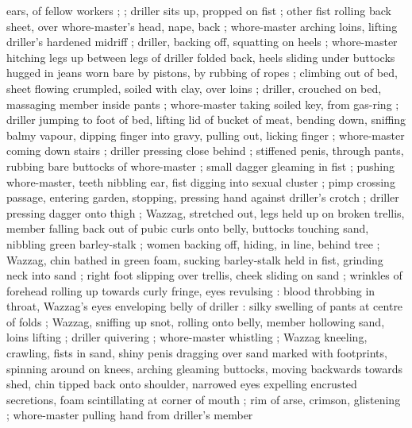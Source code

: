 ears, of fellow workers ; {\thd}  ; driller sits up, propped on fist ; other fist rolling back sheet, over whore-master's head, nape, back ; whore-master arching loins, lifting driller's hardened midriff ; driller, backing off, squatting on heels ; whore-master hitching legs up between legs of driller folded back, heels sliding under buttocks hugged in jeans worn bare by pistons, by rubbing of ropes ; climbing out of bed, sheet flowing crumpled, soiled with clay, over loins ; driller, crouched on bed, massaging member inside pants ; whore-master taking soiled key, from gas-ring ; driller jumping to foot of bed, lifting lid of bucket of meat, bending down, sniffing balmy vapour, dipping finger into gravy, pulling out, licking finger ; whore-master coming down stairs ; driller pressing close behind ; stiffened penis, through pants, rubbing bare buttocks of whore-master{\td}  ; small dagger gleaming in fist ; pushing whore-master, teeth nibbling ear, fist digging into sexual cluster ; pimp crossing passage, entering garden, stopping, pressing hand against driller's crotch ; driller pressing dagger onto thigh ; Wazzag, stretched out, legs held up on broken trellis, member falling back out of pubic curls onto belly, buttocks touching sand, nibbling green barley-stalk ; women backing off, hiding, in line, behind tree ; Wazzag, chin bathed in green foam, sucking barley-stalk held in fist, grinding neck into sand ; right foot slipping over trellis, cheek sliding on sand ; wrinkles of forehead rolling up towards curly fringe, eyes revulsing : blood throbbing in throat, Wazzag's eyes enveloping belly of driller : silky swelling of pants at centre of folds ; Wazzag, sniffing up snot, rolling onto belly, member hollowing sand, loins lifting ; driller quivering ; whore-master whistling ; Wazzag kneeling, crawling, fists in sand, shiny penis dragging over sand marked with footprints, spinning around on knees, arching gleaming buttocks, moving backwards towards shed, chin tipped back onto shoulder, narrowed eyes expelling encrusted secretions, foam scintillating at corner of mouth ; rim of arse, crimson, glistening ; whore-master pulling hand from driller's member 

